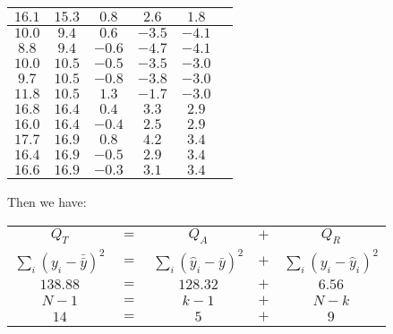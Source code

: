\begin{tcolorbox}[colframe=black,colback=white,sharp corners]
\begin{table}[H]
\begin{tabular}{|c|c|c|c|c|c|}
	        $16.1$ & $15.3$ & $0.8$ & $2.6$ & $1.8$  \\ \hline
	        $10.0$ & $9.4$ & $0.6$ & $-3.5$ & $-4.1$  \\ \hline
	        $8.8$ &	$9.4$ &	$-0.6$ & $-4.7$ & $-4.1$ \\ \hline
	        $10.0$ & $10.5$ & $-0.5$ & $-3.5$ &	$-3.0$ \\ \hline
	        $9.7$ &	$10.5$ & $-0.8$ & $-3.8$ & $-3.0$ \\ \hline
	        $11.8$ & $10.5$ & $1.3$ & $-1.7$ & $-3.0$ \\ \hline
	        $16.8$ & $16.4$ & $0.4$ & $3.3$ & $2.9$ \\ \hline
	        $16.0$ & $16.4$ & $-0.4$ & $2.5$ & $2.9$ \\ \hline
	        $17.7$ & $16.9$ & $0.8$ & $4.2$ & $3.4$ \\ \hline
	        $16.4$ & $16.9$ & $-0.5$ & $2.9$ & $3.4$ \\ \hline
	        $16.6$ & $16.9$ & $-0.3$ & $3.1$ & $3.4$ \\ \hline
		\end{tabular}
	\end{table}
	Then we have:
	\begin{table}[H]
		\centering
		\begin{tabular}{ccccc}
		$Q_T$ & $=$ & $Q_A$ & $+$ & $Q_R$  \\
		$\displaystyle\sum_i (y_i-\bar{\bar{y}})^2$ & $=$ & $\displaystyle\sum_i (\hat{y}_i-\bar{y})^2$ & $+$  & $\displaystyle\sum_i(y_i-\hat{y}_i)^2$  \\
		$138.88$ & $=$ & $128.32$ & $+$  & $6.56$  \\
		 $N-1$ & $=$ & $k-1$ & $+$ & $N-k$  \\
		 $14$ & $=$ & $5$ & $+$ & $9$  \\
		\end{tabular}
	\end{table}
	\end{tcolorbox}
	
